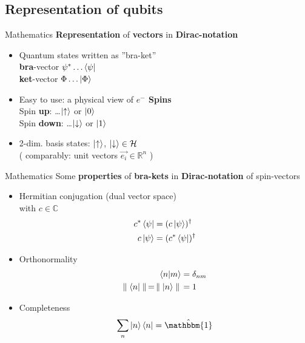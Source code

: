 \documentclass{beamer}
\begin{document}
\subsection{Representation of qubits}
\begin{frame}{Mathematics}
\textbf{Representation} of \textbf{vectors} in \textbf{Dirac-notation}
	\begin{itemize}
    	\item Quantum states written as ''bra-ket''\\
        	\textbf{bra}-vector $\psi^* \dots \bra{\psi}$ \\
            \textbf{ket}-vector $\Phi \dots \ket{\Phi}$ 
		\item Easy to use: a physical view of \textbf{$e^-$ Spins}\\
        	Spin \textbf{up}: \dots $\ket{\uparrow}$ or $\ket{0}$\\  
        	Spin \textbf{down}: \dots $\ket{\downarrow}$ or $\ket{1}$
        \item 2-dim. basis states: $\ket{\uparrow}$, $\ket{\downarrow} \in \mathcal{H}$\\( comparably: unit vectors $\vec{e_i} \in \mathbb{R}^n$ )
	\end{itemize}
\end{frame}

\begin{frame}{Mathematics}
Some \textbf{properties} of \textbf{bra-kets} in \textbf{Dirac-notation} of spin-vectors
	\begin{itemize}
    	\item Hermitian conjugation (dual vector space)\\
        	with $c\in \mathbb{C}$
        	\begin{align}
            	c^*\bra{\psi} & = (c\ket{\psi})^\dagger \\
                c\ket{\psi} & = (c^*\bra{\psi})^\dagger
            \end{align}
    	\item Orthonormality
            \begin{align}\label{orthonormality}
            	\braket{n|m} &= \delta_{nm}\\
     \parallel\bra{n}\parallel\,=\,\parallel\ket{n}\parallel\, &= 1
     		\end{align}
        \item Completeness
        	\begin{equation}
            	\sum_n \ket{n}\bra{n}=\hat{\mathbbm{1}}
            \end{equation}
	\end{itemize}
\end{frame}
    
\end{document}
